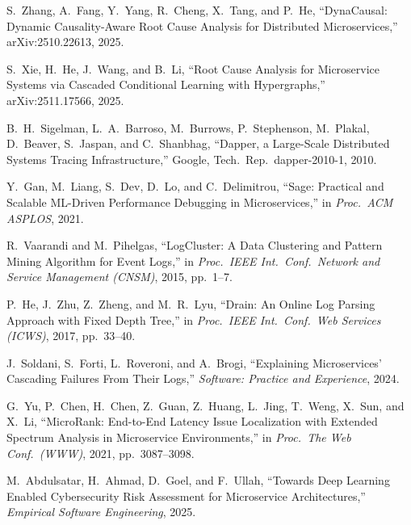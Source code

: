 \documentclass[11pt,a4paper]{article}
\begin{document}
\begin{enumerate}[leftmargin=2em,itemsep=2pt,label={[\arabic*]}]
  \item S.\ Zhang, A.\ Fang, Y.\ Yang, R.\ Cheng, X.\ Tang, and P.\ He,
        ``DynaCausal: Dynamic Causality-Aware Root Cause Analysis for
        Distributed Microservices,'' arXiv:2510.22613, 2025.

  \item S.\ Xie, H.\ He, J.\ Wang, and B.\ Li, ``Root Cause Analysis for
        Microservice Systems via Cascaded Conditional Learning with
        Hypergraphs,'' arXiv:2511.17566, 2025.

  \item B.\ H.\ Sigelman, L.\ A.\ Barroso, M.\ Burrows, P.\ Stephenson,
        M.\ Plakal, D.\ Beaver, S.\ Jaspan, and C.\ Shanbhag, ``Dapper, a
        Large-Scale Distributed Systems Tracing Infrastructure,'' Google,
        Tech.\ Rep.\ dapper-2010-1, 2010.

  \item Y.\ Gan, M.\ Liang, S.\ Dev, D.\ Lo, and C.\ Delimitrou, ``Sage:
        Practical and Scalable ML-Driven Performance Debugging in
        Microservices,'' in \emph{Proc.\ ACM ASPLOS}, 2021.

  \item R.\ Vaarandi and M.\ Pihelgas, ``LogCluster: A Data Clustering and
        Pattern Mining Algorithm for Event Logs,'' in \emph{Proc.\ IEEE Int.\
        Conf.\ Network and Service Management (CNSM)}, 2015, pp.\ 1--7.

  \item P.\ He, J.\ Zhu, Z.\ Zheng, and M.\ R.\ Lyu, ``Drain: An Online Log
        Parsing Approach with Fixed Depth Tree,'' in \emph{Proc.\ IEEE Int.\
        Conf.\ Web Services (ICWS)}, 2017, pp.\ 33--40.

  \item J.\ Soldani, S.\ Forti, L.\ Roveroni, and A.\ Brogi, ``Explaining
        Microservices' Cascading Failures From Their Logs,'' \emph{Software:
        Practice and Experience}, 2024.

  \item G.\ Yu, P.\ Chen, H.\ Chen, Z.\ Guan, Z.\ Huang, L.\ Jing, T.\ Weng,
        X.\ Sun, and X.\ Li, ``MicroRank: End-to-End Latency Issue Localization
        with Extended Spectrum Analysis in Microservice Environments,'' in
        \emph{Proc.\ The Web Conf.\ (WWW)}, 2021, pp.\ 3087--3098.

  \item M.\ Abdulsatar, H.\ Ahmad, D.\ Goel, and F.\ Ullah, ``Towards Deep
        Learning Enabled Cybersecurity Risk Assessment for Microservice
        Architectures,'' \emph{Empirical Software Engineering}, 2025.


\end{enumerate}
\end{document}

